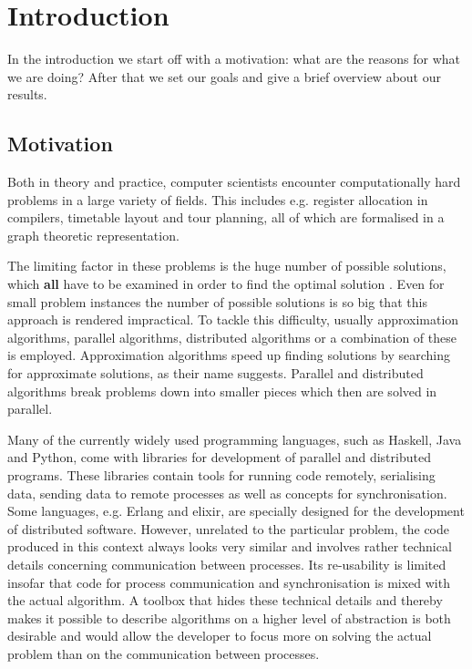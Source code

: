 \chapter{Introduction}
\vspace*{-0.5em}
In the introduction we start off with a motivation: what are the reasons for what we are doing? After that we set our goals and give a brief overview about our results.

\vspace*{-0.5em}
\section{Motivation}
Both in theory and practice, computer scientists encounter computationally hard problems in a large variety of fields. This includes e.g. register allocation in compilers, timetable layout and tour planning, all of which are formalised in a graph theoretic \cite{Garey:1979:CIG:578533} representation.

The limiting factor in these problems is the huge number of possible solutions, which \textbf{all} have to be examined in order to find the optimal solution \cite{Garey:1979:CIG:578533}. Even for small problem instances the number of possible solutions is so big that this approach is rendered impractical. To tackle this difficulty, usually approximation algorithms, parallel algorithms, distributed algorithms or a combination of these is employed. Approximation algorithms speed up finding solutions by searching for approximate solutions, as their name suggests. Parallel and distributed algorithms break problems down into smaller pieces which then are solved in parallel.

Many of the currently widely used programming languages, such as \textsf{Haskell}, \textsf{Java} and \textsf{Python}, come with libraries for development of parallel and distributed programs. These libraries contain tools for running code remotely, serialising data, sending data to remote processes as well as concepts for synchronisation. Some languages, e.g. \textsf{Erlang} and \textsf{elixir}, are specially designed for the development of distributed software. However, unrelated to the particular problem, the code produced in this context always looks very similar and involves rather technical details concerning communication between processes. Its re-usability is limited insofar that code for process communication and synchronisation is mixed with the actual algorithm. A toolbox that hides these technical details and thereby makes it possible to describe algorithms on a higher level of abstraction is both desirable and would allow the developer to focus more on solving the actual problem than on the communication between processes.

